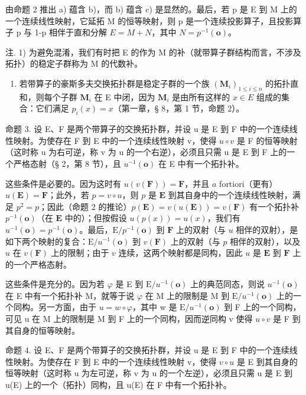 由命题 2 推出 a) 蕴含 b)，而 b) 蕴含 c) 是显然的。最后，若 p 是 E 到 M 上的一个连续线性映射，它延拓 M 的恒等映射，则 p 是一个连续投影算子，且投影算子 p 与 1-p 相伴于直和分解 \(E = M + N\)，其中 \(N = p^{-1}(\mathbf{o})\)。

注. 1) 为避免混淆，我们有时把 E 的作为 M 的补（就带算子群结构而言，不涉及拓扑）的稳定子群称为 M 的代数补。

\begin{enumerate}
\def\labelenumi{\arabic{enumi})}
\setcounter{enumi}{1}
\tightlist
\item
  若带算子的豪斯多夫交换拓扑群是稳定子群的一个族 \((\mathbf{M}_i)_{1\leqslant i\leqslant n}\) 的拓扑直和，则每个子群 \(\mathbf{M}_i\) 在 E 中闭，因为 \(\mathbf{M}_i\) 是由所有这样的 \(x\in E\) 组成的集合：它们满足 \(p_i(x) = x\)（第一章，§ 8，第 1 节，命题 2）。
\end{enumerate}

命题 3. 设 E、F 是两个带算子的交换拓扑群，并设 u 是 E 到 F 中的一个连续线性映射。为使存在 F 到 E 中的一个连续线性映射 v，使得 \(u \circ v\) 是 F 的恒等映射（这时称 u 为右可逆，称 v 为 u 的一个右逆），必须且只需 u 是 E 到 F 上的一个严格态射（§ 2，第 8 节），且 \(u^{-1}(\mathbf{o})\) 在 E 中有一个拓扑补。

这些条件是必要的。因为这时有 \(u(v(\mathbf{F})) = \mathbf{F}\)，并且 \(a\) fortiori（更有）\(u(\mathbf{E}) = \mathbf{F}\)；此外，若 \(p = v \circ u\)，则 \(p\) 是 \(\mathbf{E}\) 到其自身中的一个连续线性映射，满足 \(p^2 = p\)；因此（命题 2 的推论）\(p(\mathbf{E}) = v(u(\mathbf{E})) = v(\mathbf{F})\) 有一个拓扑补 \(p^{-1}(\mathbf{o})\)（在 \(\mathbf{E}\) 中的）；但按假设 \(u(p(x)) = u(x)\)，我们有 \(u^{-1}(\mathbf{o}) = p^{-1}(\mathbf{o})\)。最后，\(\mathrm{E}/p^{-1}(\mathbf{o})\) 到 \(\mathbf{F}\) 上的双射（与 \(u\) 相伴的双射），是如下两个映射的复合：\(\mathrm{E}/u^{-1}(\mathbf{o})\) 到 \(v(\mathbf{F})\) 上的双射（与 \(p\) 相伴的双射），以及 \(u\) 在 \(v(\mathbf{F})\) 上的限制；由于 \(v\) 连续，这两个映射都是同构，因此 \(u\) 是 \(\mathbf{E}\) 到 \(\mathbf{F}\) 上的一个严格态射。

这些条件是充分的。因为若 \(\varphi\) 是 E 到 \(\mathrm{E}/u^{-1}(\mathbf{o})\) 上的典范同态，则说 \(u^{-1}(\mathbf{o})\) 在 E 中有一个拓扑补 M，就等于说 \(\varphi\) 在 M 上的限制是 M 到 \(\mathrm{E}/u^{-1}(\mathbf{o})\) 上的一个同构。另一方面，由于 \(u=w\circ\varphi\)，其中 w 是 \(\mathrm{E}/u^{-1}(\mathbf{o})\) 到 F 上的一个同构，可见 u 在 M 上的限制是 M 到 F 上的一个同构，因而逆同构 v 使得 \(u\circ v\) 是 F 到其自身的恒等映射。

命题 4. 设 E、F 是两个带算子的交换拓扑群，并设 u 是 E 到 F 中的一个连续线性映射。为使存在 F 到 E 中的一个连续线性映射 v，使得 \(v \circ u\) 是 E 到其自身的恒等映射（这时称 u 为左可逆，称 v 为 u 的一个左逆），必须且只需 u 是 E 到 u(E) 上的一个（拓扑）同构，且 u(E) 在 F 中有一个拓扑补。

